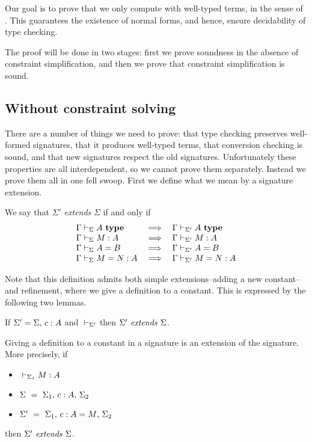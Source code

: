 
Our goal is to prove that we only compute with well-typed terms, in the sense
of {\Core}. This guarantees the existence of normal forms, and hence, ensure
decidability of type checking.

The proof will be done in two stages: first we prove soundness in the absence
of constraint simplification, and then we prove that constraint simplification
is sound.

\subsection{Without constraint solving}

There are a number of things we need to prove: that type checking preserves
well-formed signatures, that it produces well-typed terms, that conversion
checking is sound, and that new signatures respect the old signatures.
Unfortunately these properties are all interdependent, so we cannot prove them
separately. Instead we prove them all in one fell swoop. First we define what
we mean by a signature extension.

\begin{definition}
    We say that $\Sigma'$ {\em extends} $\Sigma$ if and only if
    \[\begin{array}{lcl}
	{\Gamma} \vdash_{\Sigma}A ~ \mathbf{type} & \implies & {\Gamma} \vdash_{\Sigma'}A ~ \mathbf{type} \\
	{\Gamma} \vdash_{\Sigma} {M} : {A} & \implies & {\Gamma} \vdash_{\Sigma'} {M} : {A} \\
	{\Gamma} \vdash_{\Sigma}A=B & \implies & {\Gamma} \vdash_{\Sigma'}A=B \\
	{\Gamma} \vdash_{\Sigma}M=N:A & \implies & {\Gamma} \vdash_{\Sigma'}M=N:A \\
    \end{array}\]
\end{definition}

Note that this definition admits both simple extensions--adding a new
constant--and refinement, where we give a definition to a constant. This is
expressed by the following two lemmas.

\begin{lemma} \label{lemWeakenSig}
    If $\Sigma' = {\Sigma},\,{} {c:A}$ and ${} \vdash_{\Sigma'}$ then ${\Sigma'} ~ \mathit{extends} ~ {\Sigma}$.
\end{lemma}

\begin{lemma} \label{lemRefineSig}
    Giving a definition to a constant in a signature is an extension of the
    signature. More precisely, if
    \begin{itemize}
	\item ${} \vdash_{\Sigma_1} {M} : {A}$
	\item $\Sigma ~ = ~ {\Sigma_1},\,{} {{c} : {A}},\,{} \Sigma_2$
	\item $\Sigma' ~ = ~ {\Sigma_1},\,{} {{c} : {A} = {M}},\,{} \Sigma_2$
    \end{itemize}
    then ${\Sigma'} ~ \mathit{extends} ~ {\Sigma}$.
\end{lemma}

